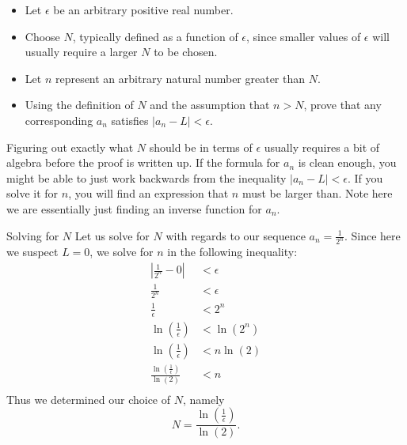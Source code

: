 \begin{itemize}
\item Let $\epsilon$ be an arbitrary positive real number.  
\item Choose $N$, typically defined as a function of $\epsilon$, since smaller values of $\epsilon$ will usually require a larger $N$ to be chosen. 
\item Let $n$ represent an arbitrary natural number greater than $N$.  
\item Using the definition of $N$ and the assumption that $n>N$, prove that any corresponding $a_n$ satisfies $\left|a_n-L\right|<\epsilon.$
\end{itemize}

Figuring out exactly what $N$ should be in terms of $\epsilon$ usually requires a bit of algebra before the proof is written up.  If the formula for $a_n$ is clean enough, you might be able to just work backwards from the inequality $\left| a_n-L \right|<\epsilon$.  If you solve it for $n$, you will find an expression that $n$ must be larger than.  Note here we are essentially just finding an inverse function for $a_n$.

\begin{example}{Solving for $N$}
Let us solve for $N$ with regards to our sequence $a_n=\frac{1}{2^n}$.  Since here we suspect $L=0$, we solve for $n$ in the following inequality: \begin{align*}
 \left| \frac{1}{2^n}-0 \right|&<\epsilon \\
  \frac{1}{2^n}&<\epsilon \\
  \frac{1}{\epsilon}&<2^n \\
  \ln\left(\frac{1}{\epsilon}\right)&<\ln\left(2^n\right) \\
  \ln\left(\frac{1}{\epsilon}\right)&<n\ln\left(2\right) \\
  \frac{\ln\left(\frac{1}{\epsilon}\right)}{\ln\left(2\right)}&<n \\
\end{align*}
Thus we determined our choice of $N$, namely $$N= \frac{\ln\left(\frac{1}{\epsilon}\right)}{\ln\left(2\right)}.$$
\end{example}

